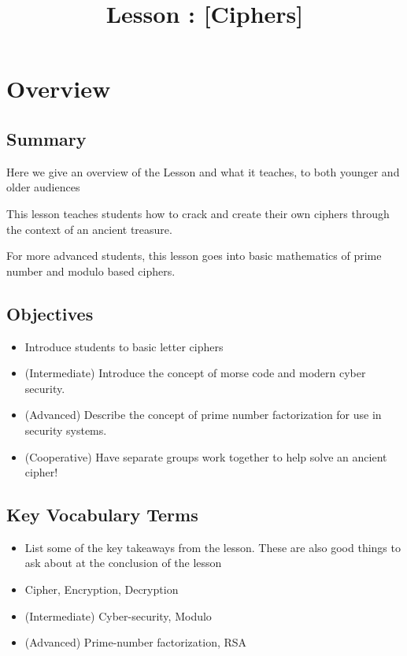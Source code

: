 \documentclass{lessonplan}
\title{Lesson \lessonNumber: [Ciphers]}
\author{\linkHome}
\date{}
\begin{document}
  \maketitle

  \section{Overview}
    \subsection{Summary}
      Here we give an overview of the Lesson and what it teaches, to
      both younger and older audiences

      This lesson teaches students how to crack and create their own
      ciphers through the context of an ancient treasure.

      For more advanced students, this lesson goes into basic mathematics 
      of prime number and modulo based ciphers. 

    \subsection{Objectives}
    \begin{itemize}
      \item Introduce students to basic letter ciphers
      \item (Intermediate) Introduce the concept of morse code and modern cyber security.
      \item (Advanced) Describe the concept of prime number factorization for use in security systems.
      \item (Cooperative) Have separate groups work together to help solve an ancient cipher!
    \end{itemize}
    \subsection{Key Vocabulary Terms}
    \begin{itemize}
      \item List some of the key takeaways from the lesson.  These are
        also good things to ask about at the conclusion of the lesson
      \item Cipher, Encryption, Decryption
      \item (Intermediate) Cyber-security, Modulo
      \item (Advanced) Prime-number factorization, RSA
    \end{itemize}
\end{document}
